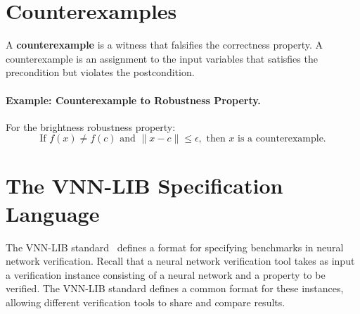 \documentclass[oneside,11pt,dvipsnames]{book}
\begin{document}



\section{Counterexamples}
A \textbf{counterexample} is a witness that falsifies the correctness property. A counterexample is an assignment to the input variables that satisfies the precondition but violates the postcondition.

\paragraph{Example: Counterexample to Robustness Property.}
For the brightness robustness property:
\[
\text{If } f(x) \neq f(c) \text{ and } \|x - c\| \leq \epsilon, \text{ then } x \text{ is a counterexample.}
\]



\section{The VNN-LIB  Specification Language}


The VNN-LIB standard~\cite{demarchi2023supporting,vnnlib} defines a format for specifying benchmarks in neural network verification. 
Recall that a neural network verification tool takes as input a verification instance consisting of a neural network and a property to be verified. The VNN-LIB standard defines a common format for these instances, allowing different verification tools to share and compare results.
\end{document}
